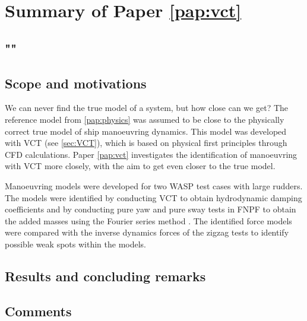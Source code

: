 \section{Summary of Paper \ref{pap:vct}}
\subsection*{""}
\subsection*{Scope and motivations}
We can never find the true model of a system, but how close can we get? The reference model from \ref{pap:physics} was assumed to be close to the physically correct true model of ship manoeuvring dynamics. This model was developed with VCT (see \ref{sec:VCT}), which is based on physical first principles through CFD calculations. Paper \ref{pap:vct} investigates the identification of manoeuvring with VCT more closely, with the aim to get even closer to the true model.

Manoeuvring models were developed for two WASP test cases with large rudders. The models were identified by conducting VCT to obtain hydrodynamic damping coefficients and by conducting pure yaw and pure sway tests in FNPF to obtain the added masses using the Fourier series method \cite{sakamoto_cfd_2021}. The identified force models were compared with the inverse dynamics forces of the zigzag tests to identify possible weak spots within the models.

\subsection*{Results and concluding remarks}
\subsection*{Comments}
\clearpage